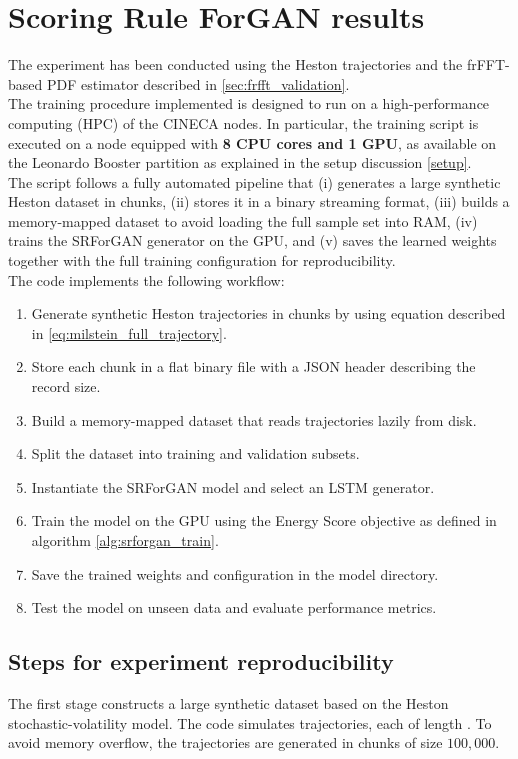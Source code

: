 \section{Scoring Rule ForGAN results}

The experiment has been conducted using the Heston trajectories and the frFFT-based PDF estimator described in \ref{sec:frfft_validation}.\\
The training procedure implemented is designed to run on a high-performance computing (HPC) of the CINECA nodes. In particular, the training script is executed on a node equipped with \textbf{8 CPU cores and 1 GPU}, as available on the Leonardo Booster partition as explained in the setup discussion \ref{setup}.\\
The script follows a fully automated pipeline that (i) generates a large synthetic Heston dataset in chunks, (ii) stores it in a binary streaming format, (iii) builds a memory-mapped dataset to avoid loading the full sample set into RAM, (iv) trains the SRForGAN generator on the GPU, and (v) saves the learned weights together with the full training configuration for reproducibility.\\

The code implements the following workflow:
\begin{enumerate}
    \item Generate synthetic Heston trajectories in chunks by using equation described in \ref{eq:milstein_full_trajectory}.
    \item Store each chunk in a flat binary file with a JSON header describing the record size.
    \item Build a memory-mapped dataset that reads trajectories lazily from disk.
    \item Split the dataset into training and validation subsets.
    \item Instantiate the SRForGAN model and select an LSTM generator.
    \item Train the model on the GPU using the Energy Score objective as defined in algorithm \ref{alg:srforgan_train}.
    \item Save the trained weights and configuration in the model directory.
    \item Test the model on unseen data and evaluate performance metrics.
\end{enumerate}

\subsection{Steps for experiment reproducibility}
The first stage constructs a large synthetic dataset based on the Heston stochastic-volatility model. 
The code simulates  trajectories, each of length . To avoid memory overflow, the trajectories are generated in chunks of size $100,000$.

